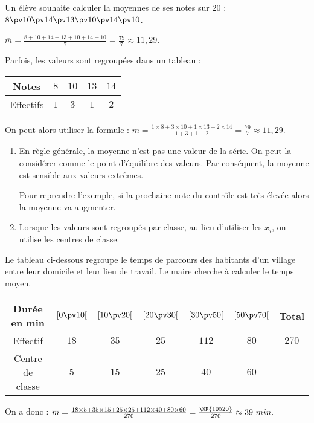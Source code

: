 \documentclass[10pt,openright,twoside,french]{book}
\begin{document}
\begin{Exemple}
    Un élève souhaite calculer la moyennes de ses notes sur $20$ : $8 \pv 10 \pv 14 \pv 13 \pv 10 \pv 14 \pv 10$.\par\medskip
    $\overline m = \frac{8 + 10 + 14 + 13 + 10 + 14 + 10}{7} = \frac{79}{7} \approx 11,29$.\medskip

    Parfois, les valeurs sont regroupées dans un tableau : \quad
    \begin{tabular}{*{5}{|c}|}
    \hline
        Notes & $8$ & $10$ & $13$ & $14$ \\
    \hline
        Effectifs & $1$ & $3$ & $1$ & $2$ \\
    \hline
    \end{tabular}\par\medskip
    On peut alors utiliser la formule : $\overline m = \frac{1 \times 8 + 3 \times 10 + 1 \times 13 + 2 \times 14}{1 + 3 + 1 + 2} = \frac{79}{7} \approx 11,29.$
\end{Exemple}

\begin{Rmq}[s]
\begin{enumerate}
    \item En règle générale, la moyenne n'est pas une valeur de la série. On peut la considérer comme le \textnormal{point d'équilibre} des valeurs. Par conséquent, la moyenne est sensible aux valeurs extrêmes.\par
        Pour reprendre l'exemple, si la prochaine note du contrôle est très élevée alors la moyenne va augmenter.
    \item Lorsque les valeurs sont regroupés par classe, au lieu d'utiliser les $x_i$, on utilise les centres de classe.
\end{enumerate}
\end{Rmq}

\begin{Exemple}
    Le tableau ci-dessous regroupe le temps de parcours des habitants d'un village entre leur domicile et leur lieu de travail. Le maire cherche à calculer le temps moyen.
    \begin{center}
    \renewcommand\arraystretch{1.5}
        \begin{tabular}{*{7}{|c}|}
            \hline
                Durée en min & $[0 \pv 10[$ & $[10 \pv 20[$ & $[20 \pv 30[$ & $[30 \pv 50[$ & $[50 \pv 70[$ & Total \\
            \hline
                Effectif & $18$ & $35$ & $25$ & $112$ & $80$ & $270$ \\
            \hline
                Centre de classe & $5$ & $15$ & $25$ & $40$ & $60$ & \\
            \hline
        \end{tabular}
    \renewcommand\arraystretch{1}
    \end{center}
    On a donc : $\overline m = \frac{18 \times 5 + 35 \times 15 + 25 \times 25 + 112 \times 40 + 80 \times 60}{270} = \frac{\NP{10520}}{270} \approx 39~min.$
\end{Exemple}
\end{document}
